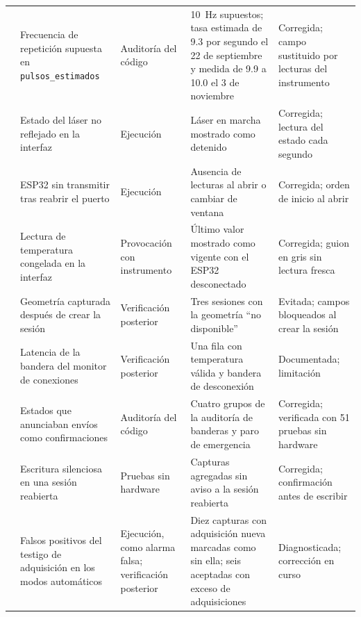 \begin{table}[H]
\begin{tabular}{p{0.4cm}>{\raggedright\arraybackslash}p{3.5cm}>{\raggedright\arraybackslash}p{2.5cm}>{\raggedright\arraybackslash}p{3.6cm}>{\raggedright\arraybackslash}p{3.3cm}}
    \addlinespace[2pt]
    7 & Frecuencia de repetición supuesta en
    \texttt{pulsos\_estimados} &
    Auditoría del código &
    \SI{10}{\hertz} supuestos; tasa estimada de 9.3 por segundo el 22 de septiembre y medida de 9.9 a 10.0 el 3 de noviembre &
    Corregida; campo sustituido por lecturas del instrumento \\
    \addlinespace[2pt]
    8 & Estado del láser no reflejado en la interfaz &
    Ejecución &
    Láser en marcha mostrado como detenido &
    Corregida; lectura del estado cada segundo \\
    \addlinespace[2pt]
    9 & ESP32 sin transmitir tras reabrir el puerto & Ejecución &
    Ausencia de lecturas al abrir o cambiar de ventana &
    Corregida; orden de inicio al abrir \\
    \addlinespace[2pt]
    10 & Lectura de temperatura congelada en la interfaz &
    Provocación con instrumento &
    Último valor mostrado como vigente con el ESP32 desconectado &
    Corregida; guion en gris sin lectura fresca \\
    \addlinespace[2pt]
    11 & Geometría capturada después de crear la sesión &
    Verificación posterior &
    Tres sesiones con la geometría \enquote{no disponible} &
    Evitada; campos bloqueados al crear la sesión \\
    \addlinespace[2pt]
    12 & Latencia de la bandera del monitor de conexiones &
    Verificación posterior &
    Una fila con temperatura válida y bandera de desconexión &
    Documentada; limitación \\
    \addlinespace[2pt]
    13 & Estados que anunciaban envíos como confirmaciones &
    Auditoría del código &
    Cuatro grupos de la auditoría de banderas y paro de emergencia &
    Corregida; verificada con 51 pruebas sin hardware \\
    \addlinespace[2pt]
    14 & Escritura silenciosa en una sesión reabierta &
    Pruebas sin hardware &
    Capturas agregadas sin aviso a la sesión reabierta &
    Corregida; confirmación antes de escribir \\
    \addlinespace[2pt]
    15 & Falsos positivos del testigo de adquisición en los modos automáticos &
    Ejecución, como alarma falsa; verificación posterior &
    Diez capturas con adquisición nueva marcadas como sin ella; seis aceptadas con exceso de adquisiciones &
    Diagnosticada; corrección en curso \\
    \bottomrule
  \end{tabular}
\end{table}

